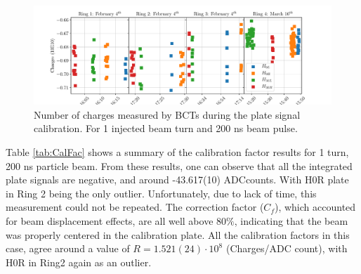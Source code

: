 \begin{figure}[h]
    \centering
    \includegraphics[width=1.0\columnwidth]{Figure_ResultsBCTStability/BctStability.pdf}
    \caption{ Number of charges measured by BCTs during the plate signal calibration. For 1 injected beam turn and 200 ns beam pulse. }
    \label{fig:IntensityMeas}
\end{figure}

Table \ref{tab:CalFac} shows a summary of the calibration factor results for 1 turn, 200 ns particle beam. From these results, one can observe that all the integrated plate signals are negative, and around -43.617(10) ADCcounts. With H0R plate in Ring 2 being the only outlier. Unfortunately, due to lack of time, this measurement could not be repeated. The correction factor ($C_f$), which accounted for beam displacement effects, are all well above 80$\%$, indicating that the beam was properly centered in the calibration plate. All the calibration factors in this case, agree around a value of $R = 1.521(24)\cdot 10^8$ (Charges/ADC count), with H0R in Ring2 again as an outlier. 


